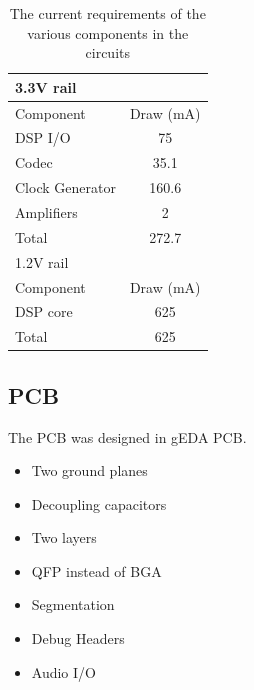 \begin{table}[H]
	\centering
	\begin{tabular}[c]{| l | c |}
		\hline
		\multicolumn{2}{|l|}{3.3V rail}\\
		\hline
		Component	& Draw (mA)	\\
		\hline
		DSP I/O		& 75	\\
		Codec		& 35.1	\\
		Clock Generator	& 160.6	\\
		Amplifiers	& 2	\\
		\hline
		Total		& 272.7	\\
		\hline
		\hline
		\multicolumn{2}{|l|}{1.2V rail}\\
		\hline
		Component	& Draw (mA)	\\
		\hline
		DSP core	& 625	\\
		\hline
		Total		& 625	\\
		\hline
	\end{tabular}	
	\caption{The current requirements of the various components in the circuits}
	\label{tab:pcbcurrentdraw}
\end{table}

\subsection{PCB}
The PCB was designed in gEDA PCB.

\begin{itemize}
	\item Two ground planes
	\item Decoupling capacitors
	\item Two layers
	\item QFP instead of BGA
	\item Segmentation
	\item Debug Headers
	\item Audio I/O
\end{itemize}

